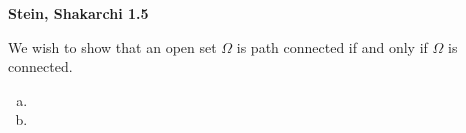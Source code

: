 \textbf{Stein, Shakarchi 1.5}

We wish to show that an open set $\Omega$ is path connected if and only if $\Omega$ is connected.

\begin{enumerate}[(a)]
    \item 
    \pagebreak
    \item 
\end{enumerate}
